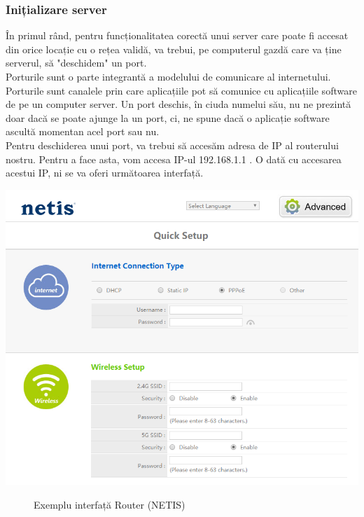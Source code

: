 \documentclass{article}
\begin{document}
			\subsubsection{Inițializare server}

			 În primul rând, pentru funcționalitatea corectă unui server care poate fi accesat din orice locație cu o rețea validă, va trebui, pe computerul gazdă care va ține serverul, să "deschidem" un port. \\

			Porturile sunt o parte integrantă a modelului de comunicare al internetului. Porturile sunt canalele prin care aplicațiile pot să comunice cu aplicațiile software de pe un computer server. Un port deschis, în ciuda numelui său, nu ne prezintă doar dacă se poate ajunge la un port, ci, ne spune dacă o aplicație software ascultă momentan acel port sau nu. \\

			Pentru deschiderea unui port, va trebui să accesăm adresa de IP al routerului nostru. Pentru a face asta, vom accesa IP-ul 192.168.1.1 . O dată cu accesarea acestui IP, ni se va oferi următoarea interfață.

	\begin{center}
		\includegraphics[scale=0.5]{Source/Router}
		\begin{figure}[!h]
			{\caption*{Exemplu interfață Router (NETIS)}}
		\end{figure}
	\end{center}
\end{document}
